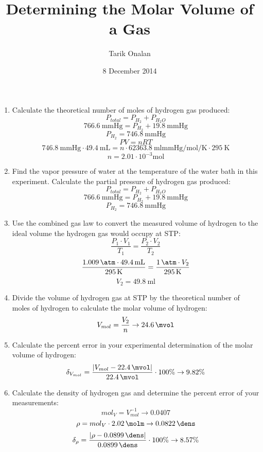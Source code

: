 \documentclass[a4paper]{article}
\title{Determining the Molar Volume of a Gas}
\date{8 December 2014}
\author{Tarik Onalan}
\def\abs#1{\left| #1 \right|}
\begin{document}
    \maketitle
    \begin{enumerate}
        \item Calculate the theoretical number of moles of hydrogen gas produced:\\
            \[P_{total}=P_{H_{2}}+P_{H_{2}O}\]
            \[\SI{766.6}{\mmHg}=P_{H_{2}}+\SI{19.8}{\mmHg}\]
            \[P_{H_{2}}=\SI{746.8}{\mmHg}\]
            \[PV=nRT\]
            \[\SI{746.8}{\mmHg} \cdot \SI{49.4}{\mL}=n \cdot \SI{62363.8}
                {\ml\mmHg\per\mol\per\K}\cdot\SI{295}{\K}\]
            \[n=2.01 \cdot 10^{-3}\si{\mol}\]
        \item Find the vapor pressure of water at the temperature of the water bath
            in this experiment. Calculate the partial pressure of hydrogen gas produced:\\
            \[P_{total}=P_{H_{2}}+P_{H_{2}O}\]
            \[\SI{766.6}{\mmHg}=P_{H_{2}}+\SI{19.8}{\mmHg}\]
            \[P_{H_{2}}=\SI{746.8}{\mmHg}\]
        \item Use the combined gas law to convert the measured volume of hydrogen to
            the ideal volume the hydrogen gas would occupy at STP:
            \[\frac{P_{1} \cdot V_{1}}{T_{1}} = \frac{P_{2} \cdot V_{2}}{T_{2}}\]
            \[\frac{\SI{1.009}{\atm} \cdot \SI{49.4}{\ml}}{\SI{295}{\K}}=
                \frac{\SI{1}{\atm} \cdot V_{2}}{\SI{295}{\K}}\]
            \[V_{2}=\SI{49.8}{\ml}\]
        \item Divide the volume of hydrogen gas at STP by the theoretical number
            of moles of hydrogen to calculate the molar volume of hydrogen:
            \[V_{mol}=\frac{V_{2}}{n} \to \SI{24.6}{\mvol}\]
        \item Calculate the percent error in your experimental determination of
            the molar volume of hydrogen:
            \[\delta_{V_{mol}}=\frac{\abs{V_{mol}-\SI{22.4}{\mvol}}}
                {\SI{22.4}{\mvol}} \cdot 100\% \to 9.82\%\]
        \item Calculate the density of hydrogen gas and determine the percent error
            of your measurements:\\
            \[mol_{V}=V^{-1}_{mol} \to 0.0407\]
            \[\rho=mol_{V} \cdot \SI{2.02}{\molm} \to \SI{0.0822}{\dens}\]
            \[\delta_{\rho}=\frac{\abs{\rho-\SI{0.0899}{\dens}}}{\SI{0.0899}{\dens}}
                \cdot 100\% \to 8.57\%\]

\end{enumerate}
\end{document}

